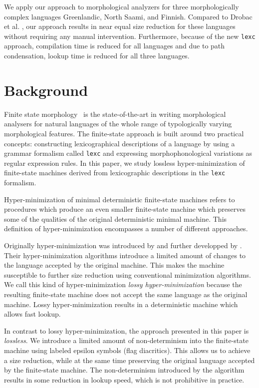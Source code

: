 \documentclass[11pt]{article}
\begin{document}
We apply our approach to morphological analyzers for three
morphologically complex languages Greenlandic, North Saami, and
Finnish. Compared to Drobac et al. , our approach
results in near equal size reduction for these languages without
requiring any manual intervention. Furthermore, because of the new
\texttt{lexc} approach, compilation time is reduced for all languages
and due to path condensation, lookup time is reduced for all three
languages.

\section{Background}
Finite state morphology~\cite{beesley2003finite} is the
state-of-the-art in writing morphological analysers for natural
languages of the whole range of typologically varying morphological
features. The finite-state approach is built around two practical
concepts: constructing lexicographical descriptions of a language
by using a grammar formalism called \texttt{lexc} and expressing morphophonological
variations as regular expression rules. In this paper, we study lossless
hyper-minimization of finite-state machines derived from lexicographic
descriptions in the \texttt{lexc} formalism.

Hyper-minimization of minimal deterministic finite-state machines
refers to procedures which produce an even smaller finite-state
machine which preserves some of the qualities of the original
deterministic minimal machine. This definition of hyper-minimization
encompasses a number of different approaches.

Originally hyper-minimization was introduced by \cite{badr2009} and
further developped by \cite{maletti2011}. Their hyper-minimization
algorithms introduce a limited amount of changes to
the language accepted by the original machine. This makes the machine
susceptible to further size reduction using conventional minimization
algorithms. We call this kind of hyper-minimization {\it lossy
  hyper-minimization} because the resulting finite-state machine does
not accept the same language as the original machine. Lossy
hyper-minimization results in a deterministic machine which allows
fast lookup.

In contrast to lossy hyper-minimization, the approach presented in
this paper is {\it lossless}. We introduce a limited amount of
non-determinism into the finite-state machine using labeled epsilon
symbols (flag diacritics). This allows us to achieve a size reduction,
while at the same time preserving the original language accepted by
the finite-state machine. The non-determinism introduced by the
algorithm results in some reduction in lookup speed, which is not
prohibitive in practice.
\end{document}
